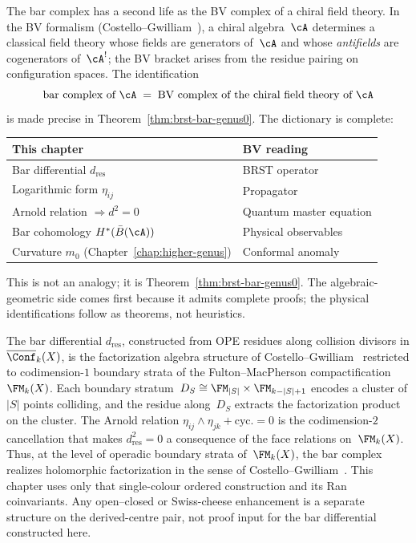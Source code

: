 \begin{remark}\label{rem:bv-parallel-track}
The bar complex has a second life as the
BV complex of a chiral field theory. In the BV formalism
(Costello--Gwilliam~\cite{CG17}), a chiral algebra~$\cA$ determines a
classical field theory whose fields are generators of~$\cA$ and whose
\emph{antifields} are cogenerators of~$\cA^!$; the BV bracket arises from
the residue pairing on configuration spaces. The identification
\[
\text{bar complex of } \cA
\;=\; \text{BV complex of the chiral field theory of } \cA
\]
is made precise in Theorem~\ref{thm:brst-bar-genus0}. The dictionary
is complete:

\begin{center}
\small
\begin{tabular}{ll}
\textbf{This chapter} & \textbf{BV reading} \\ \hline
Bar differential $d_{\mathrm{res}}$ & BRST operator \\
Logarithmic form $\eta_{ij}$ & Propagator \\
Arnold relation $\Rightarrow d^2 = 0$ & Quantum master equation \\
Bar cohomology $H^*(\bar{B}(\cA))$ & Physical observables \\
Curvature $m_0$ (Chapter~\ref{chap:higher-genus}) & Conformal anomaly
\end{tabular}
\end{center}
\noindent
This is not an analogy; it is Theorem~\ref{thm:brst-bar-genus0}.
The algebraic-geometric side comes first because it admits complete
proofs; the physical identifications follow as theorems, not
heuristics.
\end{remark}

\begin{remark}
\label{rem:costello-gwilliam-factorization}
%
%
The bar differential $d_{\mathrm{res}}$, constructed from OPE
residues along collision divisors in $\overline{\Conf}_{k}(X)$,
is the factorization algebra structure of
Costello--Gwilliam~\cite{CG17} restricted to codimension-$1$
boundary strata of the Fulton--MacPherson
compactification~$\FM_k(X)$. Each boundary
stratum~$D_S \cong \FM_{|S|} \times \FM_{k-|S|+1}$ encodes a
cluster of $|S|$ points colliding, and the residue along~$D_S$
extracts the factorization product on the cluster.
The Arnold relation $\eta_{ij} \wedge \eta_{jk} + \text{cyc.} = 0$
is the codimension-$2$ cancellation that makes $d^2_{\mathrm{res}} = 0$
a consequence of the face relations on~$\FM_k(X)$.
Thus, at the level of operadic boundary strata of~$\FM_k(X)$,
the bar complex realizes holomorphic factorization in the sense
of Costello--Gwilliam~\cite{CG17}. This chapter uses only that
single-colour ordered construction and its Ran coinvariants. Any
open--closed or Swiss-cheese enhancement is a separate structure on
the derived-centre pair, not proof input for the bar differential
constructed here.
\end{remark}

